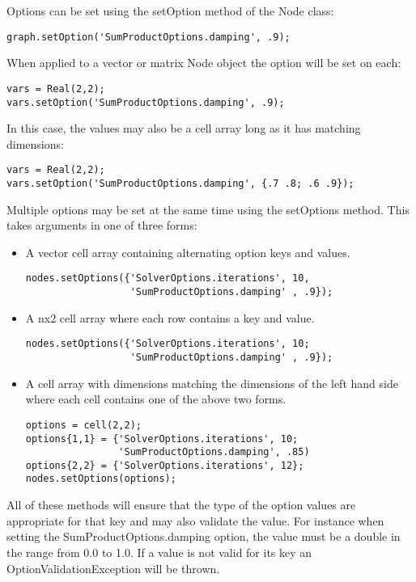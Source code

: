 \ifmatlab
Options can be set using the setOption method of the Node class:

\begin{lstlisting}
graph.setOption('SumProductOptions.damping', .9);
\end{lstlisting}

When applied to a vector or matrix Node object the option will be set on each:

\begin{lstlisting}
vars = Real(2,2);
vars.setOption('SumProductOptions.damping', .9);
\end{lstlisting}

In this case, the values may also be a cell array long as it has matching dimensions:

\begin{lstlisting}
vars = Real(2,2);
vars.setOption('SumProductOptions.damping', {.7 .8; .6 .9});
\end{lstlisting}

Multiple options may be set at the same time using the setOptions method. This takes arguments in one of three forms:

\begin{itemize}
\item A vector cell array containing alternating option keys and values.
\begin{lstlisting}
nodes.setOptions({'SolverOptions.iterations', 10,
                  'SumProductOptions.damping' , .9});
\end{lstlisting}
\item A nx2 cell array where each row contains a key and value.
\begin{lstlisting}
nodes.setOptions({'SolverOptions.iterations', 10;
                  'SumProductOptions.damping' , .9});
\end{lstlisting}
\item A cell array with dimensions matching the dimensions of the left hand side where each cell contains one of the above two forms.
\begin{lstlisting}
options = cell(2,2);
options{1,1} = {'SolverOptions.iterations', 10;
                'SumProductOptions.damping', .85)
options{2,2} = {'SolverOptions.iterations', 12};
nodes.setOptions(options);
\end{lstlisting}
\end{itemize}

\fi

All of these methods will ensure that the type of the option values are appropriate for that key and may also validate the value. For instance when setting the SumProductOptions.damping option, the value must be a double in the range from 0.0 to 1.0. If a value is not valid for its key an OptionValidationException will be thrown.

